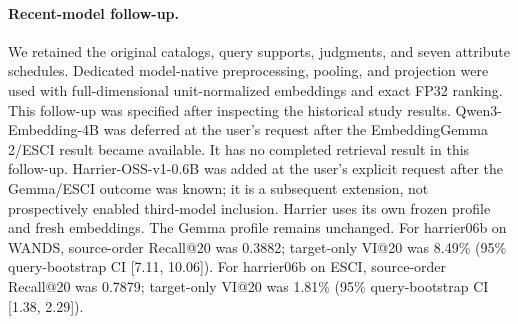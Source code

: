 \paragraph{Recent-model follow-up.} We retained the original catalogs, query supports, judgments, and seven attribute schedules. Dedicated model-native preprocessing, pooling, and projection were used with full-dimensional unit-normalized embeddings and exact FP32 ranking. This follow-up was specified after inspecting the historical study results.
Qwen3-Embedding-4B was deferred at the user's request after the EmbeddingGemma 2/ESCI result became available. It has no completed retrieval result in this follow-up. Harrier-OSS-v1-0.6B was added at the user's explicit request after the Gemma/ESCI outcome was known; it is a subsequent extension, not prospectively enabled third-model inclusion. Harrier uses its own frozen profile and fresh embeddings. The Gemma profile remains unchanged.
For harrier06b on WANDS, source-order Recall@20 was 0.3882; target-only VI@20 was 8.49\% (95\% query-bootstrap CI [7.11, 10.06]).
For harrier06b on ESCI, source-order Recall@20 was 0.7879; target-only VI@20 was 1.81\% (95\% query-bootstrap CI [1.38, 2.29]).
